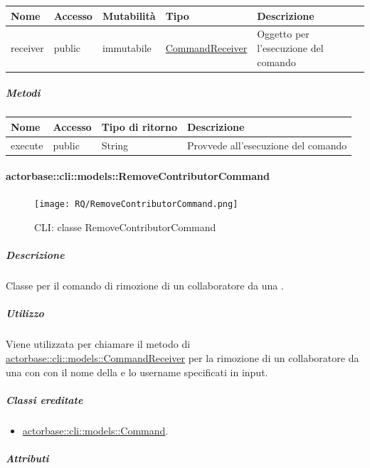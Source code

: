 \documentclass{scalatekids-article}
\begin{document}
\begin{tabular}{| p{1cm} | p{1.5cm} | p{2cm} | p{4cm} | p{8.5cm} |}
  \hline
  Nome & Accesso & Mutabilità & Tipo & Descrizione\\
  \hline
  receiver & public & immutabile & \hyperref[sec:actorbase::cli::models::CommandReceiver]{CommandReceiver} & Oggetto per l'esecuzione del comando\\
  \hline
\end{tabular}

\subparagraph{Metodi}

\begin{tabular}{| l | l | l | l |}
  \hline
  Nome & Accesso & Tipo di ritorno & Descrizione\\
  \hline
  execute & public & String & Provvede all'esecuzione del comando\\
  \hline
\end{tabular}

\paragraph{actorbase::cli::models::RemoveContributorCommand}
\label{sec:actorbase::cli::models::RemoveContributorCommand}

\begin{figure}[H]
  \begin{center}
    \texttt{[image: RQ/RemoveContributorCommand.png]}
    \caption{CLI: classe RemoveContributorCommand}
  \end{center}
\end{figure}

\subparagraph{Descrizione}

Classe per il comando di rimozione di un collaboratore da una .

\subparagraph{Utilizzo}

Viene utilizzata per chiamare il metodo di
\hyperref[sec:actorbase::cli::models::CommandReceiver]{actorbase::cli::models::CommandReceiver} per la rimozione di un collaboratore
da una  con con il nome della  e lo username
specificati in input.

\subparagraph{Classi ereditate}

\begin{itemize}
\item \hyperref[sec:actorbase::cli::models::Command]{actorbase::cli::models::Command}.
\end{itemize}

\subparagraph{Attributi}
\end{document}
